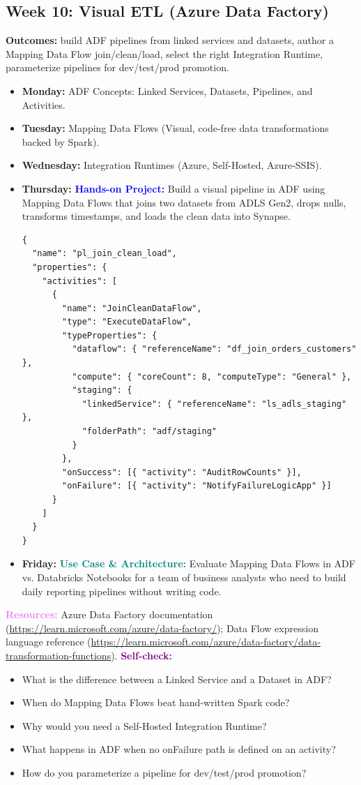 \documentclass[11pt, a4paper]{article}
\newcommand{\project}[1]{\vspace{1mm}\noindent\textbf{\textcolor{blue}{Hands-on Project:}} #1}
\newcommand{\usecase}[1]{\vspace{1mm}\noindent\textbf{\textcolor{teal}{Use Case \& Architecture:}} #1}
\newcommand{\dayitem}[2]{\item \textbf{#1:} #2}
\newcommand{\resources}[1]{\vspace{1mm}\noindent\textbf{\textcolor{violet}{Resources:}} #1}
\newcommand{\selfcheck}[1]{\vspace{1mm}\noindent\textbf{\textcolor{purple}{Self-check:}} #1}
\begin{document}
\subsection*{Week 10: Visual ETL (Azure Data Factory)}
\par\noindent\textbf{Outcomes:} build ADF pipelines from linked services and datasets, author a Mapping Data Flow join/clean/load, select the right Integration Runtime, parameterize pipelines for dev/test/prod promotion.
\begin{itemize}[label=-]
    \dayitem{Monday}{ADF Concepts: Linked Services, Datasets, Pipelines, and Activities.}
    \dayitem{Tuesday}{Mapping Data Flows (Visual, code-free data transformations backed by Spark).}
    \dayitem{Wednesday}{Integration Runtimes (Azure, Self-Hosted, Azure-SSIS).}
    \dayitem{Thursday}{\project{Build a visual pipeline in ADF using Mapping Data Flows that joins two datasets from ADLS Gen2, drops nulls, transforms timestamps, and loads the clean data into Synapse.}}
\begin{lstlisting}[language={}]
{
  "name": "pl_join_clean_load",
  "properties": {
    "activities": [
      {
        "name": "JoinCleanDataFlow",
        "type": "ExecuteDataFlow",
        "typeProperties": {
          "dataflow": { "referenceName": "df_join_orders_customers" },
          "compute": { "coreCount": 8, "computeType": "General" },
          "staging": {
            "linkedService": { "referenceName": "ls_adls_staging" },
            "folderPath": "adf/staging"
          }
        },
        "onSuccess": [{ "activity": "AuditRowCounts" }],
        "onFailure": [{ "activity": "NotifyFailureLogicApp" }]
      }
    ]
  }
}
\end{lstlisting}
    \dayitem{Friday}{\usecase{Evaluate Mapping Data Flows in ADF vs. Databricks Notebooks for a team of business analysts who need to build daily reporting pipelines without writing code.}}
\end{itemize}
\resources{Azure Data Factory documentation (\url{https://learn.microsoft.com/azure/data-factory/}); Data Flow expression language reference (\url{https://learn.microsoft.com/azure/data-factory/data-transformation-functions}).}
\selfcheck{\begin{itemize}[label=-, itemsep=0pt]
    \item What is the difference between a Linked Service and a Dataset in ADF?
    \item When do Mapping Data Flows beat hand-written Spark code?
    \item Why would you need a Self-Hosted Integration Runtime?
    \item What happens in ADF when no onFailure path is defined on an activity?
    \item How do you parameterize a pipeline for dev/test/prod promotion?
\end{itemize}}
\end{document}
